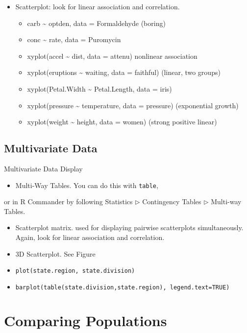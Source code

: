 \documentclass[captions=tableheading]{scrbook}
\begin{document}
\begin{itemize}
\item Scatterplot: look for linear association and correlation.
\begin{itemize}
\item carb \~{} optden, data = Formaldehyde (boring)
\item conc \~{} rate, data = Puromycin
\item xyplot(accel \~{} dist, data = attenu) nonlinear association
\item xyplot(eruptions \~{} waiting, data = faithful) (linear, two groups)
\item xyplot(Petal.Width \~{} Petal.Length, data = iris)
\item xyplot(pressure \~{} temperature, data = pressure) (exponential growth)
\item xyplot(weight \~{} height, data = women) (strong positive linear)
\end{itemize}
\end{itemize}
\subsection{Multivariate Data}
\label{sec-2-5-2}

\label{sub:Multivariate-Data}

Multivariate Data Display

\begin{itemize}
\item Multi-Way Tables. You can do this with \texttt{table},
\end{itemize}
or in \textsf{R} Commander by following \textsf{Statistics} \textsf{\(\triangleright\)} \textsf{Contingency Tables} \textsf{\(\triangleright\)} \textsf{Multi-way Tables}.
\begin{itemize}
\item Scatterplot matrix. used for displaying pairwise scatterplots simultaneously. Again, look for linear association and correlation.
\item 3D Scatterplot. See Figure \pageref{fig:3D-scatterplot-trees}
\item \texttt{plot(state.region, state.division)}
\item \texttt{barplot(table(state.division,state.region), legend.text=TRUE)}
\end{itemize}
\section{Comparing Populations}
\label{sec-2-6}
\end{document}
